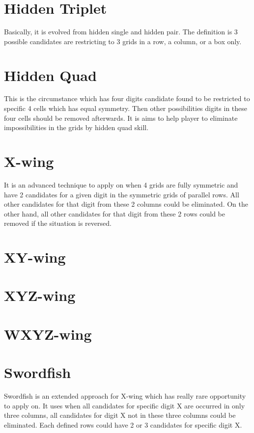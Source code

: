 \documentclass[11pt]{report}
\begin{document}
\section{Hidden Triplet}
\label{sec:Hidden Triplet}
Basically, it is evolved from hidden single and hidden pair. The definition is 3 possible candidates are restricting to 3 grids in a row, a column, or a box only.

\section{Hidden Quad}
\label{sec:Hidden Quad}
This is the circumstance which has four digits candidate found to be restricted to specific 4 cells which has equal symmetry. Then other possibilities digits in these four cells should be removed afterwards. It is aims to help player to eliminate impossibilities in the grids by hidden quad skill. 

\section{X-wing}
\label{sec:X-wing}
It is an advanced technique to apply on when 4 grids are fully symmetric and have 2 candidates for a given digit in the symmetric grids of parallel rows. All other candidates for that digit from these 2 columns could be eliminated. On the other hand, all other candidates for that digit from these 2 rows could be removed if the situation is reversed.

\section{XY-wing}
\label{sec:XY-wing}

\section{XYZ-wing}
\label{sec:XYZ-wing}

\section{WXYZ-wing}
\label{sec:WXYZ-wing}

\section{Swordfish}
\label{sec:Swordfish}
Swordfish is an extended approach for X-wing which has really rare opportunity to apply on. It uses when all candidates for specific digit X are occurred in only three columns, all candidates for digit X not in these three columns could be eliminated. Each defined rows could have 2 or 3 candidates for specific digit X.
\end{document}
